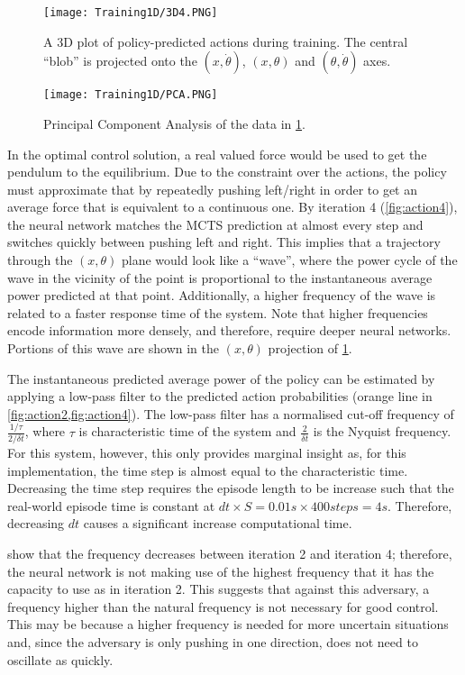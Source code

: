 \documentclass[../main.tex]{subfiles}
\begin{document}
\begin{figure}[H]
    \centering
    \texttt{[image: Training1D/3D4.PNG]}
    \caption{A 3D plot of policy-predicted actions during training. The central ``blob'' is projected onto the $(x,\dot{\theta})$, $(x, \theta)$ and $(\theta, \dot{\theta})$ axes.}
    \label{fig:3D4}
\end{figure}

\begin{figure}[H]
    \centering
    \texttt{[image: Training1D/PCA.PNG]}
    \caption{Principal Component Analysis of the data in \cref{fig:3D4}.}
    \label{fig:PCA}
\end{figure}

In the optimal control solution, a real valued force would be used to get the pendulum to the equilibrium. Due to the constraint over the actions, the policy must approximate that by repeatedly pushing left/right in order to get an average force that is equivalent to a continuous one. By iteration 4 (\cref{fig:action4}), the neural network matches the MCTS prediction at almost every step and switches quickly between pushing left and right. This implies that a trajectory through the $(x, \theta)$ plane would look like a ``wave'', where the power cycle of the wave in the vicinity of the point is proportional to the instantaneous average power predicted at that point. Additionally, a higher frequency of the wave is related to a faster response time of the system. Note that higher frequencies encode information more densely, and therefore, require deeper neural networks. Portions of this wave are shown in the $(x, \theta)$ projection of \cref{fig:3D4}.

The instantaneous predicted average power of the policy can be estimated by applying a low-pass filter to the predicted action probabilities (orange line in \cref{fig:action2,fig:action4}). The low-pass filter has a normalised cut-off frequency of $\frac{1/\tau}{2/\delta t}$, where $\tau$ is characteristic time of the system and $\frac{2}{\delta t}$ is the Nyquist frequency. For this system, however, this only provides marginal insight as, for this implementation, the time step is almost equal to the characteristic time. Decreasing the time step requires the episode length to be increase such that the real-world episode time is constant at $dt\times S = 0.01s \times 400steps = 4s$. Therefore, decreasing $dt$ causes a significant increase computational time.

 show that the frequency decreases between iteration 2 and iteration 4; therefore, the neural network is not making use of the highest frequency that it has the capacity to use as in iteration 2. This suggests that against this adversary, a frequency higher than the natural frequency is not necessary for good control. This may be because a higher frequency is needed for more uncertain situations and, since the adversary is only pushing in one direction, does not need to oscillate as quickly.
\end{document}
